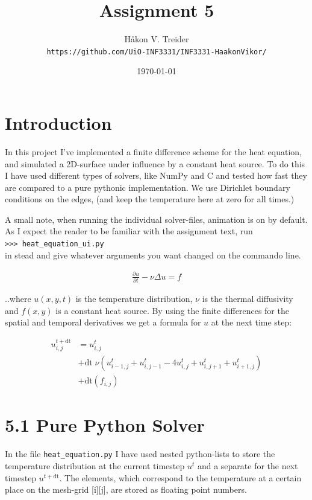 \documentclass[a4paper]{article}
\title{Assignment 5}
\author{Håkon V. Treider\\\texttt{https://github.com/UiO-INF3331/INF3331-HaakonVikor/}}
\date{\today}
\begin{document}
\maketitle

\section*{Introduction}

In this project I've implemented a finite difference scheme for the heat equation, and simulated a 2D-surface under influence by a constant heat source. To do this I have used different types of solvers, like NumPy and C and tested how fast they are compared to a pure pythonic implementation. We use Dirichlet boundary conditions on the edges, (and keep the temperature here at zero for all times.)

A small note, when running the individual solver-files, animation is on by default. As I expect the reader to be familiar with the assignment text, run\\
\texttt{>>> heat\_equation\_ui.py}\\
in stead and give whatever arguments you want changed on the commando line.

\begin{align}
\label{EQ:heat}
\frac{\partial u}{\partial t} - \nu\Delta u = f 
\end{align}

..where $u(x,y,t)$ is the temperature distribution, $\nu$ is the thermal diffusivity and $f(x,y)$ is a constant heat source. By using the finite differences for the spatial and temporal derivatives we get a formula for $u$ at the next time step:

\begin{align}
\label{EQ:upd_formula}
u^{t+\text{dt}}_{i,j} &= u^{t}_{i,j}\\
& + \text{dt}\;\nu\left(u^{t}_{i-1,j} + u^{t}_{i,j-1} - 4u^{t}_{i,j} + u^{t}_{i,j+1} + u^{t}_{i+1,j}\right)\nonumber\\
& + \text{dt}\left(f_{i,j}\right)\nonumber
\end{align}

\section*{5.1 Pure Python Solver}
In the file \texttt{heat\_equation.py} I have used nested python-lists to store the temperature distribution at the current timestep $u^t$ and a separate for the next timestep $u^{t+\text{dt}}$. The elements, which correspond to the temperature at a certain place on the mesh-grid [i][j], are stored as floating point numbers.
\newline
\end{document}

